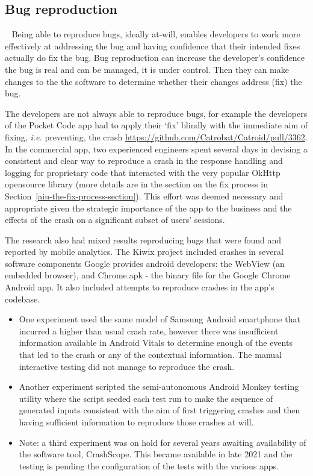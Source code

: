 \subsection{Bug reproduction}~\label{aiu-bug-reproduction}
Being able to reproduce bugs, ideally at-will, enables developers to work more effectively at addressing the bug and having confidence that their intended fixes actually do fix the bug. 
Bug reproduction can increase the developer's confidence the bug is real and can be managed, it is under control. Then they can make changes to the the software to determine whether their changes address (fix) the bug. 

The developers are not always able to reproduce bugs, for example the developers of the Pocket Code app had to apply their `fix' blindly with the immediate aim of fixing, \emph{i.e.} preventing, the crash \url{https://github.com/Catrobat/Catroid/pull/3362}.  In the commercial app, two experienced engineers spent several days in devising a consistent and clear way to reproduce a crash in the response handling and logging for proprietary code that interacted with the very popular OkHttp opensource library (more details are in the section on the fix process in Section~\ref{aiu-the-fix-process-section}). This effort was deemed necessary and appropriate given the strategic importance of the app to the business and the effects of the crash on a significant subset of users' sessions.

The research also had mixed results reproducing bugs that were found and reported by mobile analytics.
%
The Kiwix project included crashes in several software components Google provides android developers: the WebView (an embedded browser), and Chrome.apk - the binary file for the Google Chrome Android app. It also included attempts to reproduce crashes in the app's codebase. 

\begin{itemize}
    \item One experiment used the same model of Samsung Android smartphone that incurred a higher than usual crash rate, however there was insufficient information available in Android Vitals to determine enough of the events that led to the crash or any of the contextual information. The manual interactive testing did not manage to reproduce the crash.
    \item Another experiment scripted the semi-autonomous Android Monkey testing utility where the script seeded each test run to make the sequence of generated inputs consistent with the aim of first triggering crashes and then having sufficient information to reproduce those crashes at will.
    \item Note: a third experiment was on hold for several years awaiting availability of the software tool, CrashScope. This became available in late 2021 and the testing is pending the configuration of the tests with the various apps.
\end{itemize}

